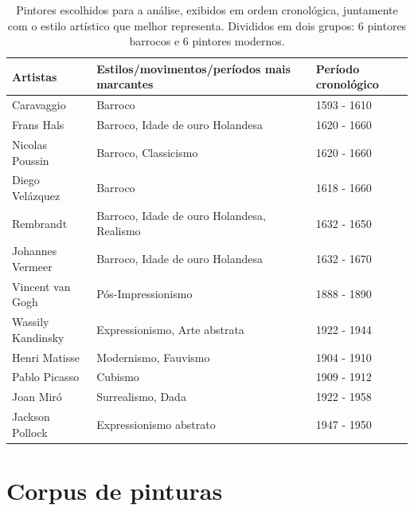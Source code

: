 \begin{table}[h!]
\begin{center}
\caption{\label{tab:painters} Pintores escolhidos para a análise, exibidos em
  ordem cro\-no\-ló\-gi\-ca, juntamente com o estilo artístico que melhor
  representa. Divididos em dois grupos: 6 pintores barrocos e 6 pintores modernos.}

\begin{tabular}{l|l|l}
\hline \hline

 \textbf{Artistas}                      & \textbf{Estilos/movimentos/períodos mais marcantes} & \textbf{Período cronológico} \\ 
 
 \hline

 Caravaggio                    & Barroco & 1593 - 1610 \\
 Frans Hals                    & Barroco, Idade de ouro Holandesa & 1620 - 1660\\
 Nicolas Poussin               & Barroco, Classicismo & 1620 - 1660\\
 Diego Velázquez           & Barroco & 1618 - 1660\\
 Rembrandt                     & Barroco, Idade de ouro Holandesa, Realismo & 1632 - 1650\\
 Johannes Vermeer              & Barroco, Idade de ouro Holandesa & 1632 - 1670\\
 
 \hline
 
 Vincent van Gogh              & Pós-Impressionismo & 1888 - 1890\\
 Wassily Kandinsky             & Expressionismo, Arte abstrata & 1922 - 1944\\
 Henri Matisse                 & Modernismo, Fauvismo & 1904 - 1910\\
 Pablo Picasso                 & Cubismo & 1909 - 1912\\
 Joan Miró                 & Surrealismo, Dada & 1922 - 1958\\
 Jackson Pollock               & Expressionismo abstrato & 1947 - 1950\\

\hline \hline
\end{tabular}
\fonteminha
\end{center}
\end{table}


\section{Corpus de pinturas}

